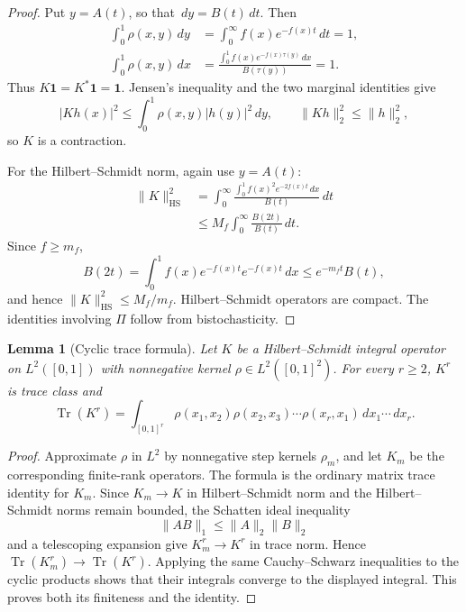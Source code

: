 \documentclass[11pt]{article}
\newtheorem{lemma}[theorem]{Lemma}
\theoremstyle{remark}
\newcommand{\one}{\mathbf 1}
\newcommand{\dd}{\,d}
\begin{document}
\begin{proof}
Put $y=A(t)$, so that $\dd y=B(t)\dd t$.  Then
\[
\begin{aligned}
        \int_0^1\rho(x,y)\dd y
        &=\int_0^\infty f(x)e^{-f(x)t}\dd t=1,\\
        \int_0^1\rho(x,y)\dd x
        &=\frac{\int_0^1f(x)e^{-f(x)\tau(y)}\dd x}
        {B(\tau(y))}=1.
\end{aligned}
\]
Thus $K\one=K^*\one=\one$.  Jensen's inequality and the two marginal
identities give
\[
        |Kh(x)|^2\le\int_0^1\rho(x,y)|h(y)|^2\dd y,
        \qquad
        \|Kh\|_2^2\le\|h\|_2^2,
\]
so $K$ is a contraction.

For the Hilbert--Schmidt norm, again use $y=A(t)$:
\[
\begin{aligned}
        \|K\|_{\mathrm{HS}}^2
        &=\int_0^\infty
        \frac{\int_0^1f(x)^2e^{-2f(x)t}\dd x}{B(t)}\dd t\\
        &\le M_f\int_0^\infty\frac{B(2t)}{B(t)}\dd t.
\end{aligned}
\]
Since $f\ge m_f$,
\[
        B(2t)=\int_0^1f(x)e^{-f(x)t}e^{-f(x)t}\dd x
        \le e^{-m_ft}B(t),
\]
and hence $\|K\|_{\mathrm{HS}}^2\le M_f/m_f$.  Hilbert--Schmidt operators are
compact.  The identities involving $\Pi$ follow from bistochasticity.
\end{proof}

\begin{lemma}[Cyclic trace formula]\label{lem:cyclic-trace-formula}
Let $K$ be a Hilbert--Schmidt integral operator on $L^2([0,1])$ with
nonnegative kernel $\rho\in L^2([0,1]^2)$.  For every $r\ge2$, $K^r$ is trace
class and
\[
 \operatorname{Tr}(K^r)
 =\int_{[0,1]^r}\rho(x_1,x_2)\rho(x_2,x_3)\cdots
 \rho(x_r,x_1)\dd x_1\cdots\dd x_r.
\]
\end{lemma}

\begin{proof}
Approximate $\rho$ in $L^2$ by nonnegative step kernels $\rho_m$, and let
$K_m$ be the corresponding finite-rank operators.  The formula is the ordinary
matrix trace identity for $K_m$.  Since $K_m\to K$ in Hilbert--Schmidt norm and
the Hilbert--Schmidt norms remain bounded, the Schatten ideal inequality
\[
        \|AB\|_1\le\|A\|_2\|B\|_2
\]
and a telescoping expansion give $K_m^r\to K^r$ in trace norm.  Hence
$\operatorname{Tr}(K_m^r)\to\operatorname{Tr}(K^r)$.  Applying the same
Cauchy--Schwarz inequalities to the cyclic products shows that their integrals
converge to the displayed integral.  This proves both its finiteness and the
identity.
\end{proof}
\end{document}
